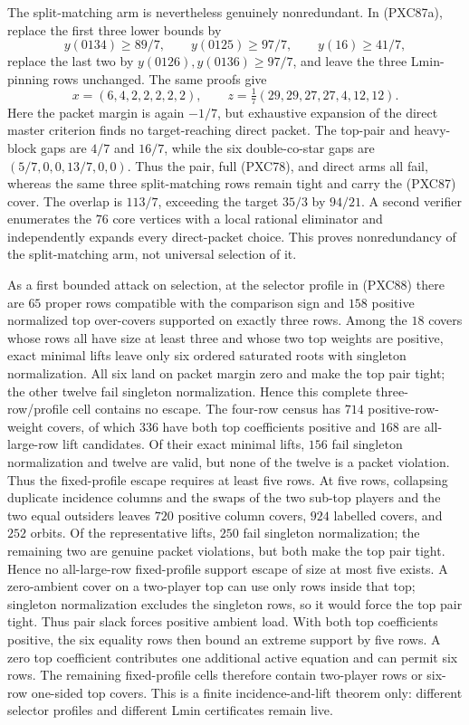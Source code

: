 \documentclass[11pt]{article}
\begin{document}
The split-matching arm is nevertheless genuinely nonredundant.  In
(PXC87a), replace the first three lower bounds by
\[
 y(0134)\ge89/7,\qquad y(0125)\ge97/7,\qquad
 y(16)\ge41/7,
\]
replace the last two by $y(0126),y(0136)\ge97/7$, and leave the three
Lmin-pinning rows unchanged.  The same proofs give
\[
 x=(6,4,2,2,2,2,2),\qquad
 z=\tfrac17(29,29,27,27,4,12,12).                  \tag{PXC88}
\]
Here the packet margin is again $-1/7$, but exhaustive expansion of the
direct master criterion finds no target-reaching direct packet.  The
top-pair and heavy-block gaps are $4/7$ and $16/7$, while the six
double-co-star gaps are $(5/7,0,0,13/7,0,0)$.  Thus the pair, full
(PXC78), and direct arms all fail, whereas the same three split-matching
rows remain tight and carry the (PXC87) cover.  The overlap is $113/7$,
exceeding the target $35/3$ by $94/21$.  A second verifier enumerates
the $76$ core vertices with a local rational eliminator and independently
expands every direct-packet choice.  This proves nonredundancy of the
split-matching arm, not universal selection of it.

As a first bounded attack on selection, at the selector profile in (PXC88)
there are $65$ proper rows compatible with the comparison sign and $158$
positive
normalized top over-covers supported on exactly three rows.  Among the
$18$ covers whose rows all have size at least three and whose two top
weights are positive, exact minimal lifts leave only six ordered saturated
roots with singleton normalization.  All six land on packet
margin zero and make the top pair tight; the other twelve fail singleton
normalization.  Hence this complete three-row/profile cell contains no
escape.  The four-row census has $714$ positive-row-weight covers, of
which $336$ have both top coefficients positive and $168$ are all-large-row
lift candidates.  Of their exact minimal lifts, $156$ fail singleton
normalization and twelve are valid, but none of the
twelve is a packet violation.  Thus the fixed-profile escape requires at
least five rows.  At five rows, collapsing duplicate incidence columns and
the swaps of the two sub-top players and the two equal outsiders leaves
$720$ positive column covers, $924$ labelled covers, and $252$ orbits.  Of
the representative lifts, $250$ fail singleton normalization;
the remaining two are genuine packet violations, but both make the top pair
tight.  Hence no all-large-row fixed-profile support escape of size at most
five exists.  A zero-ambient cover on a two-player top can use only rows
inside that top; singleton normalization excludes the singleton rows, so it
would force the top pair tight.  Thus pair slack forces positive ambient
load.  With both top coefficients positive, the six equality rows then bound
an extreme support by five rows.  A zero top coefficient contributes one
additional active equation and can permit six rows.  The remaining
fixed-profile cells therefore contain two-player rows or six-row one-sided
top covers.  This is a finite incidence-and-lift theorem only: different
selector profiles and different Lmin certificates remain live.
\end{document}
